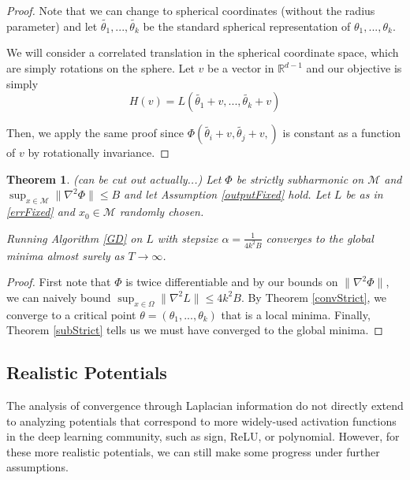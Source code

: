 \documentclass{article}
\newtheorem{theorem}{Theorem}[section]
\newcommand{\R}{{\mathbb{R}}}
\begin{document}
\begin{proof}
Note that we can change to spherical coordinates (without the radius parameter) and let $\widetilde{\theta_1},...,\widetilde{\theta_{k}}$ be the standard spherical representation of $\theta_1,...,\theta_k$. 

We will consider a correlated translation in the spherical coordinate space, which are simply rotations on the sphere. Let $v$ be a vector in $\R^{d-1}$ and our objective is simply
\[ H(v) = L( \widetilde{\theta_1}+v,...,\widetilde{\theta_{k}} +v)\]

Then, we apply the same proof since $\Phi( \widetilde{\theta_i}+v, \widetilde{\theta_j}+v,)$ is constant as a function of $v$ by rotationally invariance.
\end{proof}

\begin{theorem} (can be cut out actually...)
Let $\Phi$ be strictly subharmonic on $\mathcal{M}$ and $\sup_{x \in \mathcal{M}} \|\nabla^2 \Phi\|\leq B$ and let Assumption \ref{outputFixed} hold. Let $L$ be as in \eqref{errFixed} and $x_0 \in \mathcal{M}$ randomly chosen. 

Running Algorithm \ref{GD} on $L$ with stepsize $\alpha = \frac{1}{4k^2B}$ converges to the global minima almost surely as $T\to\infty$.
\end{theorem}

\begin{proof}
First note that $\Phi$ is twice differentiable and by our bounds on $\|\nabla^2\Phi\|$, we can naively bound $\sup_{x\in\Omega}\|\nabla^2L\|\leq 4k^2B$. By Theorem \ref{convStrict}, we converge to a critical point $\theta = (\theta_1,...,\theta_k)$ that is a local minima. Finally, Theorem \ref{subStrict} tells us we must have converged to the global minima.
\end{proof}


\subsection{Realistic Potentials}

The analysis of convergence through Laplacian information do not directly extend to analyzing potentials that correspond to more widely-used activation functions in the deep learning community, such as sign, ReLU, or polynomial. However, for these more realistic potentials, we can still make some progress under further assumptions. 
\end{document}
